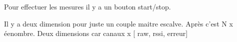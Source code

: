 Pour effectuer les mesures il y a un bouton start/stop.

Il y a deux dimension pour juste un couple maitre escalve. Après c'est N x éenombre. Deux dimensions car canaux x [ raw, rssi, erreur]







